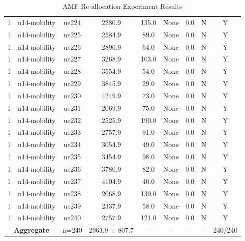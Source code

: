 \begin{table}[ht]
\begin{tabular}{|c|c|c|c|c|c|c|c|c|}
1 & n14-mobility & ue224 & 2280.9 & 135.0 & None & 0.0 & N & Y \\
1 & n14-mobility & ue225 & 2584.9 & 89.0 & None & 0.0 & N & Y \\
1 & n14-mobility & ue226 & 2896.9 & 64.0 & None & 0.0 & N & Y \\
1 & n14-mobility & ue227 & 3268.9 & 103.0 & None & 0.0 & N & Y \\
1 & n14-mobility & ue228 & 3554.9 & 54.0 & None & 0.0 & N & Y \\
1 & n14-mobility & ue229 & 3845.9 & 29.0 & None & 0.0 & N & Y \\
1 & n14-mobility & ue230 & 4249.9 & 73.0 & None & 0.0 & N & Y \\
1 & n14-mobility & ue231 & 2069.9 & 75.0 & None & 0.0 & N & Y \\
1 & n14-mobility & ue232 & 2525.9 & 190.0 & None & 0.0 & N & Y \\
1 & n14-mobility & ue233 & 2757.9 & 91.0 & None & 0.0 & N & Y \\
1 & n14-mobility & ue234 & 3054.9 & 49.0 & None & 0.0 & N & Y \\
1 & n14-mobility & ue235 & 3454.9 & 98.0 & None & 0.0 & N & Y \\
1 & n14-mobility & ue236 & 3780.9 & 82.0 & None & 0.0 & N & Y \\
1 & n14-mobility & ue237 & 4104.9 & 40.0 & None & 0.0 & N & Y \\
1 & n14-mobility & ue238 & 2068.9 & 139.0 & None & 0.0 & N & Y \\
1 & n14-mobility & ue239 & 2337.9 & 58.0 & None & 0.0 & N & Y \\
1 & n14-mobility & ue240 & 2757.9 & 121.0 & None & 0.0 & N & Y \\
\multicolumn{2}{|c|}{\textbf{Aggregate}} & n=240 & 2963.9 $\pm$ 807.7 & -- & -- & -- & -- & 240/240 \\
\hline
\end{tabular}
\caption{AMF Re-allocation Experiment Results}
\label{tab:amf_realloc}
\end{table}
